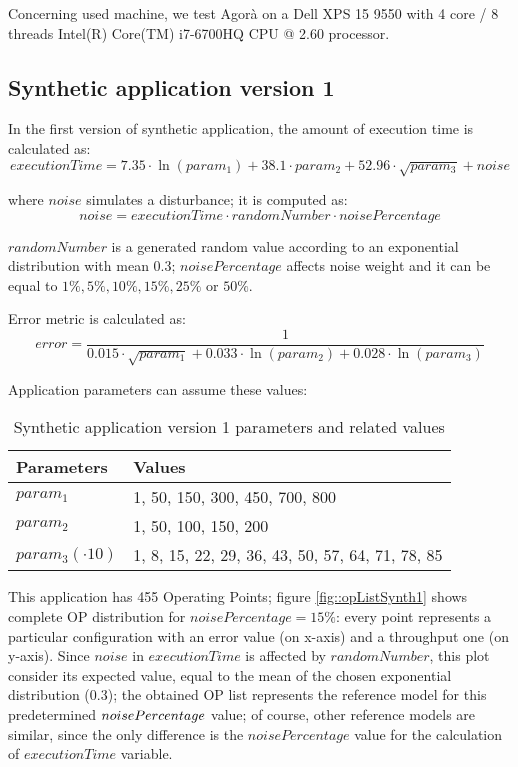 Concerning used machine, we test Agorà on a Dell XPS 15 9550 with 4 core / 8 threads Intel(R) Core(TM) i7-6700HQ CPU @ 2.60 processor.


\subsection{Synthetic application version 1}

In the first version of synthetic application, the amount of execution time is calculated as:
\[
executionTime = 7.35 \cdot \ln{(param_1)} + 38.1 \cdot param_2 + 52.96 \cdot \sqrt{param_3} + noise
\]

where $noise$ simulates a disturbance; it is computed as:
\[
noise = executionTime \cdot randomNumber \cdot noisePercentage
\]

$randomNumber$ is a generated random value according to an exponential distribution with mean 0.3; $noisePercentage$ affects noise weight and it can be equal to $1\%, 5\%, 10\%, 15\%, 25\%$ or $50\%$.

Error metric is calculated as:
\[
error = \dfrac{1}{0.015 \cdot \sqrt{param_1} + 0.033 \cdot \ln{(param_2)} + 0.028 \cdot \ln{(param_3)}}
\]

Application parameters can assume these values:

\begin{table}[H]

    \centering

    \begin{tabular}{ll}
    
        \toprule
        Parameters & Values \\
        \midrule
        $param_1$ & 1, 50, 150, 300, 450, 700, 800 \\
        $param_2$ & 1, 50, 100, 150, 200 \\
        $param_3 (\cdot 10)$ & 1, 8, 15, 22, 29, 36, 43, 50, 57, 64, 71, 78, 85 \\
        \bottomrule 
    
    \end{tabular}

    \caption{Synthetic application version 1 parameters and related values}

\end{table}

This application has 455 Operating Points; figure \ref{fig::opListSynth1} shows complete OP distribution for $noisePercentage = 15\%$: every point represents a particular configuration with an error value (on x-axis) and a throughput one (on y-axis). Since $noise$ in $executionTime$ is affected by $randomNumber$, this plot consider its expected value, equal to the mean of the chosen exponential distribution (0.3); the obtained OP list represents the reference model for this predetermined $noise\-Per\-cent\-age$ value; of course, other reference models are similar, since the only difference is the $noisePercentage$ value for the calculation of $executionTime$ variable.

